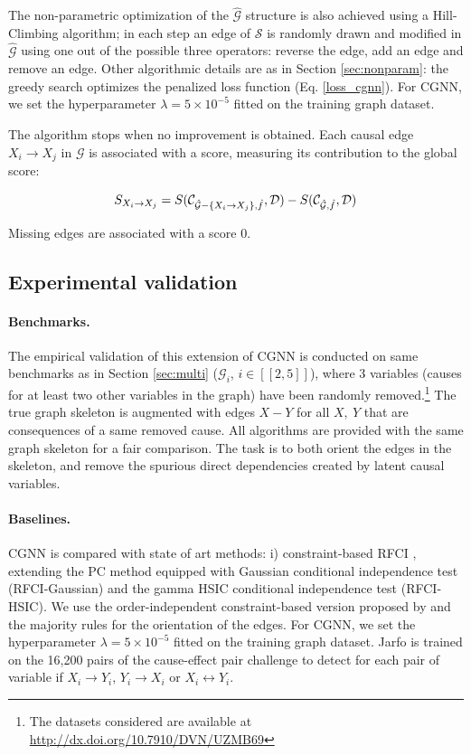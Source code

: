 \documentclass[a4paper, 11pt]{article}
\begin{document}
The non-parametric optimization of the $\hat{\mathcal{G}}$ structure is also achieved using a Hill-Climbing algorithm; in each step an edge of $\mathcal{S}$ is randomly drawn and modified in $\hat{\mathcal{G}}$ using one out of the possible three operators: reverse the edge, add an edge and remove an edge. Other algorithmic details are as in Section \ref{sec:nonparam}: the greedy search optimizes the penalized loss function (Eq. \ref{loss_cgnn}).
For CGNN, we set the hyperparameter $\lambda = 5 \times 10^{-5}$ fitted on the training graph dataset. 

The algorithm stops when no improvement is obtained. Each causal  edge $X_i \rightarrow X_j$ in $\mathcal{G}$ is associated with a score, measuring its contribution to the global score:

\begin{equation}
S_{X_i \rightarrow X_j} = S(\mathcal{C}_{\hat{\mathcal{G}} - \{X_i \rightarrow X_j\},\hat{f}}, \mathcal{D}) - S(\mathcal{C}_{\hat{\cal G},\hat{f}}, \mathcal{D}) 
\end{equation}

Missing edges are associated with a score 0.

\subsection{Experimental validation}
\paragraph{Benchmarks.} The empirical validation of this extension of CGNN is conducted on same benchmarks as in Section \ref{sec:multi} ($\mathcal{G}_i$, $i \in [[2,5]]$), where 3 variables (causes for at least two other variables in the graph) have been randomly removed.\footnote{The datasets considered are available at \url{http://dx.doi.org/10.7910/DVN/UZMB69}} The true graph skeleton is augmented with edges $X-Y$ for all $X,~Y$ that are consequences of a same removed cause. All algorithms are provided with the same graph skeleton for a fair comparison.  The task is to both orient the edges in the skeleton, and remove the spurious direct dependencies created by latent causal variables.

\paragraph{Baselines.} CGNN is compared with state of art methods: i) constraint-based RFCI \citep{colombo2012learning}, extending the PC method equipped with Gaussian conditional independence test (RFCI-Gaussian) and the gamma HSIC conditional independence test \citep{gretton2005kernel} (RFCI-HSIC).  We use the order-independent constraint-based version proposed by \cite{colombo2014order} and the majority rules for the orientation of the edges. For CGNN, we set the hyperparameter $\lambda = 5 \times 10^{-5}$ fitted on the training graph dataset.  Jarfo is trained on the 16,200 pairs of the cause-effect pair challenge \citep{guyon2013cepc,IGuyon2014} to detect for each pair of variable if $X_i \rightarrow Y_i$, $Y_i \rightarrow X_i$ or $X_i \leftrightarrow Y_i$. 
\end{document}
